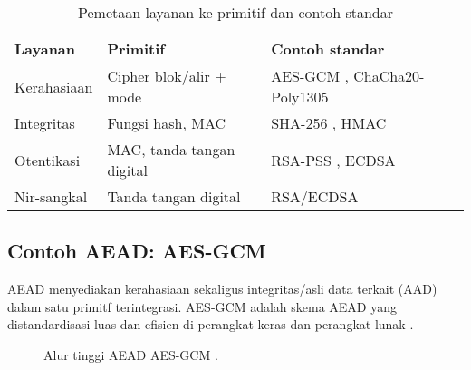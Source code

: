 \documentclass[../main.tex]{subfiles}
\begin{document}
\begin{table}[h]
\centering
\caption{Pemetaan layanan ke primitif dan contoh standar}
\label{tab:layanan-primitif}
\begin{tabular}{lll}
\toprule
Layanan & Primitif & Contoh standar \\
\midrule
Kerahasiaan & Cipher blok/alir + mode & AES-GCM \parencite{nist80038d}, ChaCha20-Poly1305 \parencite{rfc8439} \\
Integritas & Fungsi hash, MAC & SHA-256 \parencite{fips1804}, HMAC \\
Otentikasi & MAC, tanda tangan digital & RSA-PSS \parencite{rfc8017}, ECDSA \\
Nir-sangkal & Tanda tangan digital & RSA/ECDSA \parencite{rfc8017} \\
\bottomrule
\end{tabular}
\end{table}

\subsection{Contoh AEAD: AES-GCM}
AEAD menyediakan kerahasiaan sekaligus integritas/asli data terkait (AAD) dalam satu primitf terintegrasi. AES-GCM adalah skema AEAD yang distandardisasi luas dan efisien di perangkat keras dan perangkat lunak \parencite{rfc5116,nist80038d}.

\begin{figure}[h]
\centering
{}
\caption{Alur tinggi AEAD AES-GCM \parencite{rfc5116,nist80038d}.}
\label{fig:aead-gcm}
\end{figure}
\end{document}
